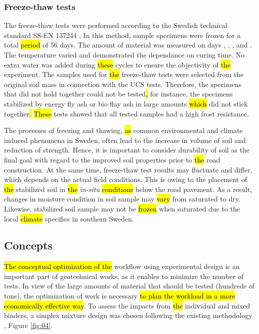\documentclass[materials,article,submit,pdftex,moreauthors]{Definitions/mdpi}
\begin{document}
\subsubsection{Freeze-thaw tests}
The freeze-thaw tests were performed according to the Swedish technical standard SS-EN 137244 \cite{SIS2005}. In this method, sample specimens were frozen for a total \hl{period} of 56 days. The amount of material was measured on days , , ,  and . The temperature varied and demonstrated the dependance on curing time. No extra water was added during \hl{these} cycles to ensure the objectivity of \hl{the} experiment. The samples used for \hl{the} freeze-thaw tests were selected from the original soil mass in connection with the UCS tests. Therefore, the specimens that did not hold together could\hl{ }not be tested\hl{, }for instance, the specimens stabilized by energy fly ash or bio flay ash in large amounts \hl{which} did not stick together\hl{. }\hl{These} tests showed that all \hl{ }tested samples had a high frost resistance. 

The processes of freezing and thawing, \hl{as} common environmental and climate induced phenomena in Sweden, often lead to the increase in volume of soil and reduction of strength. Hence, it is important to consider durability of soil as the final goal with regard to the improved soil properties prior to \hl{the} road construction. At the same time, freeze-thaw test results may fluctuate and differ, which depends on the actual field conditions. This is owing to the placement of \hl{the} stabilized soil in \hl{the} \emph{in-situ} \hl{conditions} below the road pavement. As a result, changes in moisture condition in soil sample may \hl{vary} from saturated to dry. Likewise, stabilized soil sample may not be \hl{frozen} when saturated due to the local \hl{climate} specifics in southern Sweden. 

\subsection{Concepts}
\hl{The conceptual optimization of the} workflow using experimental design is an important part of geotechnical works, as it enables to minimize the number of tests. In view of the large amounts of material that should be tested (hundreds of tons), the optimization of work is necessary \hl{to plan the workload in a more economically effective way}. To assess the impacts from \hl{the} individual and mixed binders, a simplex mixture design was chosen following the existing methodology \cite{MyersMontgomery}, Figure \ref{fig:04}. 
\end{document}
